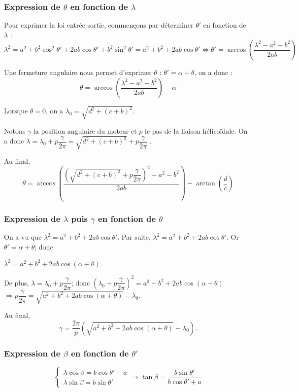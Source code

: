 \documentclass[10pt,fleqn]{article} %
\begin{document}
\subsubsection{Expression de $\theta$ en fonction de $\lambda$}
Pour exprimer la loi entrée sortie, commençons par déterminer $\theta'$ en fonction de $\lambda$ : 
$$
\lambda^2 
=  a^2 +b^2\cos^2\theta' + 2ab\cos\theta'  + b^2\sin^2 \theta'
=  a^2 +b^2 + 2ab\cos\theta' 
\Longleftrightarrow 
\theta' = \arccos \left(\dfrac{\lambda^2 - a^2 - b^2 }{2ab} \right)
$$

Une fermeture angulaire nous permet d'exprimer $\theta$ : $\theta' = \alpha + \theta$, on a donc :
$$
\theta = \arccos \left(\dfrac{\lambda^2 - a^2 - b^2 }{2ab} \right) - \alpha
$$

Lorsque $\theta=0$, on a $\lambda_0 = \sqrt{d^2 + (c+b)^2}$.


Notons $\gamma$ la position angulaire du moteur et $p$ le pas de la liaison hélicoïdale. On a donc $\lambda = \lambda_0 + p \dfrac{\gamma}{2\pi}=\sqrt{d^2 + (c+b)^2} + p \dfrac{\gamma}{2\pi}$ .

Au final, 
$$
\theta = \arccos \left(\dfrac{\left( \sqrt{d^2 + (c+b)^2} + p \dfrac{\gamma}{2\pi}\right)^2 - a^2 - b^2 }{2ab} \right) - \arctan\left( \dfrac{d}{c}\right)
$$

\subsubsection{Expression de $\lambda$ puis $\gamma$ en fonction de $\theta$}
On a vu que  $\lambda^2 =  a^2 +b^2 + 2ab\cos\theta' $. 
Par suite, $\lambda^2 =  a^2 +b^2 + 2ab\cos\theta' $. Or $\theta' = \alpha + \theta$; donc 

$\lambda^2 =  a^2 +b^2 + 2ab\cos\left( \alpha + \theta \right) $.

De plus, $\lambda = \lambda_0 + p \dfrac{\gamma}{2\pi}$; donc 
$\left(\lambda_0 + p \dfrac{\gamma}{2\pi}\right)^2 =  a^2 +b^2 + 2ab\cos\left( \alpha + \theta \right) $
$\Rightarrow   p \dfrac{\gamma}{2\pi} =  \sqrt{a^2 +b^2 + 2ab\cos\left( \alpha + \theta \right)} - \lambda_0$.

Au final, 
$$ \gamma =   \dfrac{2\pi}{p}\left(\sqrt{a^2 +b^2 + 2ab\cos\left( \alpha + \theta \right)} - \lambda_0\right).$$

\subsubsection{Expression de $\beta$ en fonction de $\theta'$}
$$
\left\{
\begin{array}{l}
\lambda\cos\beta = b \cos\theta' + a \\
\lambda\sin \beta = b \sin \theta' 
\end{array}
\right.
\Rightarrow
\tan\beta = \dfrac{ b \sin \theta' }{b \cos\theta' + a}$$
\end{document}
